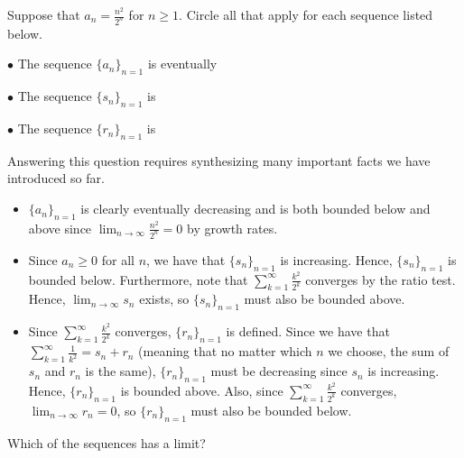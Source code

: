 \documentclass{ximera}
\author{Jim Talamo}
\begin{document}
\begin{exercise}

Suppose that $a_n = \frac{n^2}{2^n}$ for $n \geq 1$. Circle all that apply for each sequence listed below.

$\bullet$ The sequence $\{a_n\}_{n=1}$ is eventually
\begin{selectAll}
\end{selectAll}

$\bullet$ The sequence $\{s_n\}_{n=1}$ is
\begin{selectAll}
\end{selectAll}

$\bullet$ The sequence $\{r_n\}_{n=1}$ is
\begin{selectAll}
\end{selectAll}

\begin{hint}
Answering this question requires synthesizing many important facts we have introduced so far.

\begin{itemize}
\item $\{a_n\}_{n=1}$ is clearly eventually decreasing and is both bounded below and above since $\lim_{n \to \infty} \frac{n^2}{2^n} = 0$ by growth rates.  
\item Since $a_n \geq 0$ for all $n$, we have that $\{s_n\}_{n=1}$ is increasing.  Hence, $\{s_n\}_{n=1}$ is bounded below.  Furthermore, note that $\sum_{k=1}^{\infty} \frac{k^2}{2^k}$ converges by the ratio test.  Hence, $\lim_{n \to \infty} s_n$ exists, so $\{s_n\}_{n=1}$ must also be bounded above.
\item Since $\sum_{k=1}^{\infty} \frac{k^2}{2^k}$ converges, $\{r_n\}_{n=1}$ is defined.   Since we have that $\sum_{k=1}^{\infty} \frac{1}{k^2} = s_n +r_n$ (meaning that no matter which $n$ we choose, the sum of $s_n$ and $r_n$ is the same), $\{r_n\}_{n=1}$ must be decreasing since $s_n$ is increasing.  Hence, $\{r_n\}_{n=1}$ is bounded above.  Also, since $\sum_{k=1}^{\infty} \frac{k^2}{2^k}$ converges, $\lim_{n \to \infty} r_n=0$, so $\{r_n\}_{n=1}$ must also be bounded below.
\end{itemize}

\end{hint}

\begin{exercise}
Which of the sequences has a limit?
\begin{selectAll}
\end{selectAll}
\end{exercise}

\end{exercise}
\end{document}
